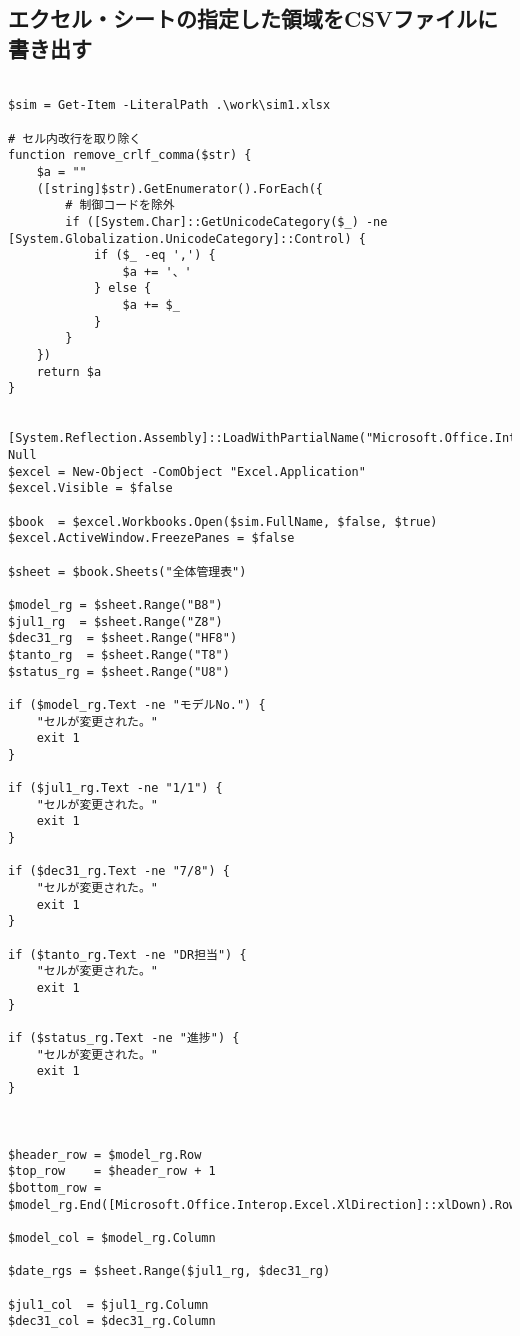 \documentclass[dvipdfmx]{jsarticle}
\begin{document}
\subsection{エクセル・シートの指定した領域をCSVファイルに書き出す}

\begin{verbatim}

$sim = Get-Item -LiteralPath .\work\sim1.xlsx

# セル内改行を取り除く
function remove_crlf_comma($str) {
    $a = ""
    ([string]$str).GetEnumerator().ForEach({
        # 制御コードを除外
        if ([System.Char]::GetUnicodeCategory($_) -ne [System.Globalization.UnicodeCategory]::Control) {
            if ($_ -eq ',') {
                $a += '、'
            } else {
                $a += $_
            }
        }
    })
    return $a
}


[System.Reflection.Assembly]::LoadWithPartialName("Microsoft.Office.Interop.Excel")|Out-Null
$excel = New-Object -ComObject "Excel.Application"
$excel.Visible = $false

$book  = $excel.Workbooks.Open($sim.FullName, $false, $true)
$excel.ActiveWindow.FreezePanes = $false

$sheet = $book.Sheets("全体管理表")

$model_rg = $sheet.Range("B8")
$jul1_rg  = $sheet.Range("Z8")
$dec31_rg  = $sheet.Range("HF8")
$tanto_rg  = $sheet.Range("T8")
$status_rg = $sheet.Range("U8")

if ($model_rg.Text -ne "モデルNo.") {
    "セルが変更された。"
    exit 1
}

if ($jul1_rg.Text -ne "1/1") {
    "セルが変更された。"
    exit 1
}

if ($dec31_rg.Text -ne "7/8") {
    "セルが変更された。"
    exit 1
}

if ($tanto_rg.Text -ne "DR担当") {
    "セルが変更された。"
    exit 1
}

if ($status_rg.Text -ne "進捗") {
    "セルが変更された。"
    exit 1
}



$header_row = $model_rg.Row
$top_row    = $header_row + 1  
$bottom_row = $model_rg.End([Microsoft.Office.Interop.Excel.XlDirection]::xlDown).Row

$model_col = $model_rg.Column

$date_rgs = $sheet.Range($jul1_rg, $dec31_rg)

$jul1_col  = $jul1_rg.Column
$dec31_col = $dec31_rg.Column



\end{verbatim}
\end{document}
